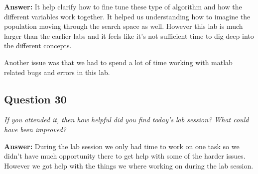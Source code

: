 \documentclass[a4paper]{article}
\begin{document}
\textbf{Answer:} It help clarify how to fine tune these type of algorithm and how the different variables work together. It helped us understanding how to imagine the population moving through the search space as well. However this lab is much larger than the earlier labs and it feels like it's not sufficient time to dig deep into the different concepts. 

Another issue was that we had to spend a lot of time working with matlab related bugs and errors in this lab.

\subsection*{Question 30}
\emph{If you attended it, then how helpful did you find today's lab
session? What could have been improved?}

\textbf{Answer:} During the lab session we only had time to work on one task so we didn't have much opportunity there to get help with some of the harder issues. However we got help with the things we where working on during the lab session. 
\end{document}
